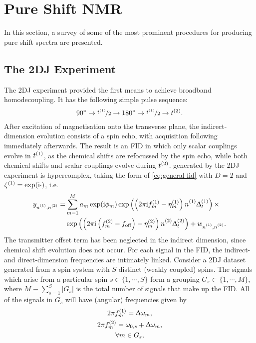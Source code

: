 \section{Pure Shift \acs{NMR}}
In this section, a survey of some of the most prominent procedures for
producing pure shift spectra are presented.
\subsection{The \acs{2DJ} Experiment}
The \ac{2DJ} experiment\cite{Aue1976, Morris2009} provided the first means to
achieve broadband homodecoupling. It has the following simple pulse sequence:
\[
    \ang{90} \rightarrow \nicefrac{t^{(1)}}{2} \rightarrow \ang{180} \rightarrow \nicefrac{t^{(1)}}{2} \rightarrow t^{(2)}.
\]
After excitation of magnetisation onto the transverse plane, the
indirect-dimension evolution consists of a spin echo, with acquisition
following
immediately afterwards. The result is an \ac{FID} in which only scalar
couplings evolve in $t^{(1)}$, as the chemical shifts are refocussed by the
spin echo, while both chemical shifts and scalar
couplings evolve during $t^{(2)}$.  generated by the \ac{2DJ}
experiment is hypercomplex, taking the form of \cref{eq:general-fid} with
$D=2$ and $\zeta^{(1)} = \exp(\mathrm{i}\cdot)$, i.e.
\begin{equation}%
    \begin{split}%
        y_{\none,\ntwo} =
        &\sum_{m=1}^{M} a_m \exp(\iu \phi_m)
            \exp\left(\left(2 \pi \iu \fonem - \etaonem\right) \none \Dtone\right) \times \\
        &\exp\left(\left(2 \pi \iu  \left(\ftwom - \foff\right)
            - \etatwom\right) \ntwo \Dttwo\right)
            + w_{\none,\ntwo}.
    \end{split}%
    \label{eq:jres-fid}%
\end{equation}%
The transmitter offset term has been neglected in the indirect dimension, since
chemical shift evolution does not occur.
For each signal in the \ac{FID}, the indirect- and direct-dimension
frequencies are intimately linked. Consider a \ac{2DJ} dataset generated from a
spin system with $S$ distinct (weakly coupled) spins. The signals which arise
from a particular spin $s \in \lbrace 1, \cdots, S \rbrace$ form a grouping $G_s
\subset \lbrace 1, \cdots, M \rbrace$, where $M \equiv \sum_{s=1}^S \lvert G_s
\rvert$ is the total number of signals that make up the \ac{FID}. All of the
signals in $G_s$ will have (angular) frequencies given by
\begin{subequations}
    \begin{gather}
        2 \pi f_m^{(1)} = \Updelta \omega_m,\\
        2 \pi f_m^{(2)} = \omega_{0,s} + \Updelta \omega_m,\\
        \forall m \in G_s\notag,
    \end{gather}%
    \label{eq:f1-f2-2dj}%
\end{subequations}
